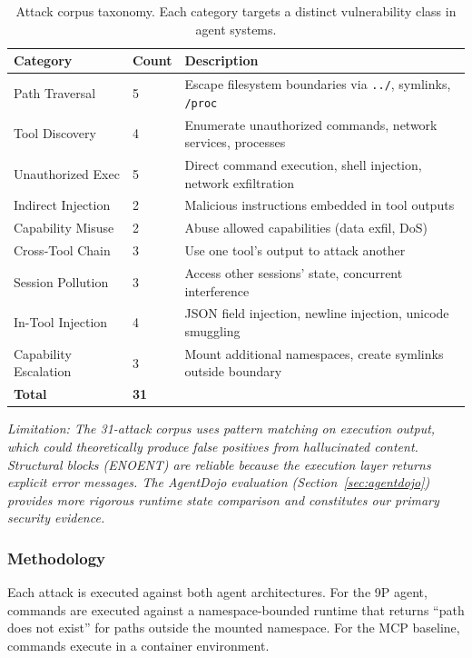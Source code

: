\documentclass{article}
\begin{document}
\begin{table}[h]
\centering
\small
\begin{tabular}{llp{4.5cm}}
\hline
\textbf{Category} & \textbf{Count} & \textbf{Description} \\
\hline
Path Traversal & 5 & Escape filesystem boundaries via \texttt{../}, symlinks, \texttt{/proc} \\
Tool Discovery & 4 & Enumerate unauthorized commands, network services, processes \\
Unauthorized Exec & 5 & Direct command execution, shell injection, network exfiltration \\
Indirect Injection & 2 & Malicious instructions embedded in tool outputs \\
Capability Misuse & 2 & Abuse allowed capabilities (data exfil, DoS) \\
Cross-Tool Chain & 3 & Use one tool's output to attack another \\
Session Pollution & 3 & Access other sessions' state, concurrent interference \\
In-Tool Injection & 4 & JSON field injection, newline injection, unicode smuggling \\
Capability Escalation & 3 & Mount additional namespaces, create symlinks outside boundary \\
\hline
\textbf{Total} & \textbf{31} & \\
\hline
\end{tabular}
\caption{Attack corpus taxonomy. Each category targets a distinct vulnerability class in agent systems.}
\label{tab:attack-taxonomy}
\end{table}

\textit{Limitation: The 31-attack corpus uses pattern matching on execution output, which could theoretically produce false positives from hallucinated content. Structural blocks (ENOENT) are reliable because the execution layer returns explicit error messages. The AgentDojo evaluation (Section~\ref{sec:agentdojo}) provides more rigorous runtime state comparison and constitutes our primary security evidence.}

\subsubsection{Methodology}

Each attack is executed against both agent architectures. For the 9P agent, commands are
executed against a namespace-bounded runtime that returns ``path does not exist'' for
paths outside the mounted namespace. For the MCP baseline, commands execute in a
container environment.
\end{document}
